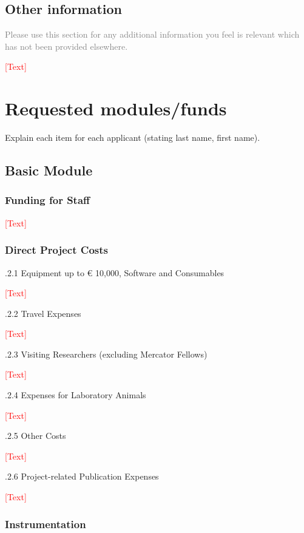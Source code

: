 \documentclass[a4paper,11pt]{article}
\begin{document}
\subsection{Other information}
\textcolor{gray}{Please use this section for any additional information you feel is relevant which has not been provided elsewhere.}

\noindent\textcolor{red}{[Text]}



\section{Requested modules/funds}
Explain each item for each applicant (stating last name, first name).

\subsection{Basic Module}

\subsubsection{Funding for Staff}

\noindent\textcolor{red}{[Text]}

\subsubsection{Direct Project Costs}

.2.1	Equipment up to € 10,000, Software and Consumables

\noindent\textcolor{red}{[Text]}

.2.2	Travel Expenses

\noindent\textcolor{red}{[Text]}

.2.3	Visiting Researchers (excluding Mercator Fellows)

\noindent\textcolor{red}{[Text]}

.2.4	Expenses for Laboratory Animals

\noindent\textcolor{red}{[Text]}

.2.5	Other Costs

\noindent\textcolor{red}{[Text]}

.2.6	Project-related Publication Expenses

\noindent\textcolor{red}{[Text]}


\subsubsection{Instrumentation}
\end{document}
